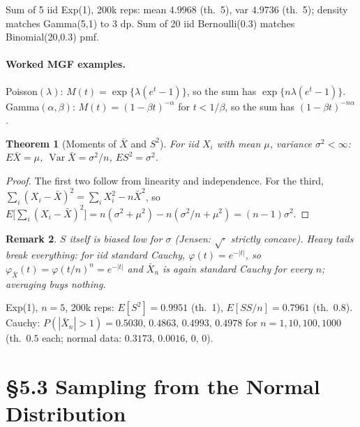 \documentclass[11pt]{article}
\newtheorem{theorem}{Theorem}[section]
\newtheorem{remark}[theorem]{Remark}
\DeclareMathOperator{\Var}{Var}\DeclareMathOperator{\Cov}{Cov}\DeclareMathOperator{\E}{E}
\begin{document}
\begin{simbox}
Sum of 5 iid Exp(1), 200k reps: mean $4.9968$ (th.\ 5), var $4.9736$ (th.\ 5); density matches Gamma(5,1) to 3 dp. Sum of 20 iid Bernoulli(0.3) matches Binomial(20,0.3) pmf.
\end{simbox}

\paragraph{Worked MGF examples.} Poisson$(\lambda)$: $M(t)=\exp\{\lambda(e^t-1)\}$, so the sum has $\exp\{n\lambda(e^t-1)\}$. Gamma$(\alpha,\beta)$: $M(t)=(1-\beta t)^{-\alpha}$ for $t<1/\beta$, so the sum has $(1-\beta t)^{-n\alpha}$.
\begin{theorem}[Moments of $\bar X$ and $S^2$]
For iid $X_i$ with mean $\mu$, variance $\sigma^2<\infty$: $E\bar X=\mu$, $\Var\bar X=\sigma^2/n$, $ES^2=\sigma^2$.
\end{theorem}
\begin{proof}
The first two follow from linearity and independence. For the third, $\sum_i(X_i-\bar X)^2=\sum_iX_i^2-n\bar X^2$, so
$E\big[\sum_i(X_i-\bar X)^2\big]=n(\sigma^2+\mu^2)-n(\sigma^2/n+\mu^2)=(n-1)\sigma^2$.
\end{proof}
\begin{remark}
$S$ itself is biased low for $\sigma$ (Jensen: $\sqrt\cdot$ strictly concave). Heavy tails break everything: for iid standard Cauchy, $\varphi(t)=e^{-|t|}$, so $\varphi_{\bar X}(t)=\varphi(t/n)^n=e^{-|t|}$ and $\bar X_n$ is again standard Cauchy for every $n$; averaging buys nothing.
\end{remark}
\begin{simbox}
Exp(1), $n=5$, 200k reps: $E[S^2]=0.9951$ (th.\ 1), $E[SS/n]=0.7961$ (th.\ $0.8$). Cauchy: $P(|\bar X_n|>1)=0.5030,\,0.4863,\,0.4993,\,0.4978$ for $n=1,10,100,1000$ (th.\ $0.5$ each; normal data: $0.3173,\,0.0016,\,0,\,0$).
\end{simbox}

\section{\S5.3 Sampling from the Normal Distribution}
\end{document}
